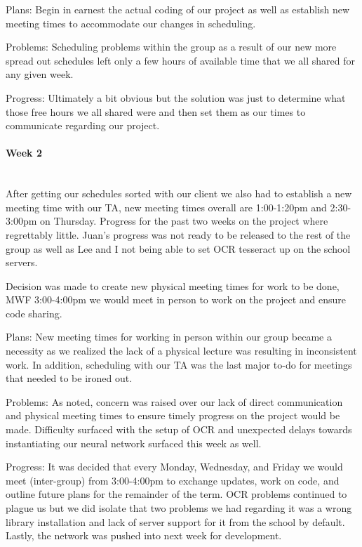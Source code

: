 \documentclass[article, onecolumn, draftclsnofoot,10pt, compsoc]{IEEEtran}
\begin{document}
Plans:
Begin in earnest the actual coding of our project as well as establish new meeting times to accommodate our changes in scheduling. 
 
Problems:
Scheduling problems within the group as a result of our new more spread out schedules left only a few hours of available time that we all shared for any given week.
 
Progress:
Ultimately a bit obvious but the solution was just to determine what those free hours we all shared were and then set them as our times to communicate regarding our project. 


\paragraph{Week 2}
\mbox{}\\
After getting our schedules sorted with our client we also had to establish a new meeting time with our TA, new meeting times overall are 1:00-1:20pm and 2:30-3:00pm on Thursday. Progress for the past two weeks on the project where regrettably little. Juan's progress was not ready to be released to the rest of the group as well as Lee and I not being able to set OCR tesseract up on the school servers.
 
Decision was made to create new physical meeting times for work to be done, MWF 3:00-4:00pm we would meet in person to work on the project and ensure code sharing. 
 
Plans:
New meeting times for working in person within our group became a necessity as we realized the lack of a physical lecture was resulting in inconsistent work. In addition, scheduling with our TA was the last major to-do for meetings that needed to be ironed out.
 
Problems:
As noted, concern was raised over our lack of direct communication and physical meeting times to ensure timely progress on the project would be made. Difficulty surfaced with the setup of OCR and unexpected delays towards instantiating our neural network surfaced this week as well.
 
Progress:
It was decided that every Monday, Wednesday, and Friday we would meet (inter-group) from 3:00-4:00pm to exchange updates, work on code, and outline future plans for the remainder of the term. OCR problems continued to plague us but we did isolate that two problems we had regarding it was a wrong library installation and lack of server support for it from the school by default. Lastly, the network was pushed into next week for development.
\end{document}
